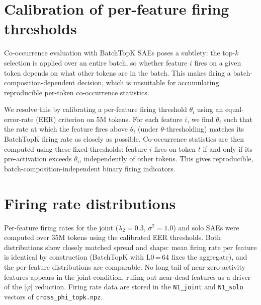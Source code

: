 \documentclass{article} %
\begin{document}



\appendix

\section{Calibration of per-feature firing thresholds}
\label{app:calibration}

Co-occurrence evaluation with BatchTopK SAEs poses a subtlety: the top-$k$
selection is applied over an entire batch, so whether feature $i$ fires on a
given token depends on what other tokens are in the batch.
This makes firing a batch-composition-dependent decision, which is unsuitable
for accumulating reproducible per-token co-occurrence statistics.

We resolve this by calibrating a per-feature firing threshold $\theta_i$ using
an equal-error-rate (EER) criterion on 5M tokens.
For each feature $i$, we find $\theta_i$ such that the rate at which the feature
fires above $\theta_i$ (under $\theta$-thresholding) matches its BatchTopK firing
rate as closely as possible.
Co-occurrence statistics are then computed using these fixed thresholds:
feature $i$ fires on token $t$ if and only if its pre-activation exceeds $\theta_i$,
independently of other tokens.
This gives reproducible, batch-composition-independent binary firing indicators.

\section{Firing rate distributions}
\label{app:firing}

Per-feature firing rates for the joint ($\lambda_2=0.3$, $\sigma^2=1.0$) and
solo SAEs were computed over 35M tokens using the calibrated EER thresholds.
Both distributions show closely matched spread and shape: mean firing rate
per feature is identical by construction (BatchTopK with L0\,=\,64 fixes the
aggregate), and the per-feature distributions are comparable.
No long tail of near-zero-activity features appears in the joint condition,
ruling out near-dead features as a driver of the $|\varphi|$ reduction.
Firing rate data are stored in the \texttt{N1\_joint} and \texttt{N1\_solo}
vectors of \texttt{cross\_phi\_topk.npz}.
\end{document}
